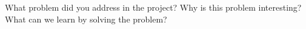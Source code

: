 What problem did you address in the project? Why is this problem
interesting? What can we learn by solving the problem?\citep{APA:83}